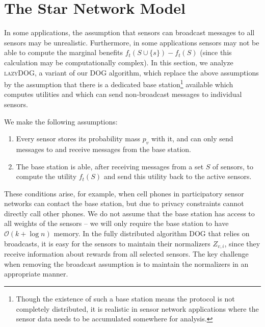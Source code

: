 \documentclass{sig-alternate-dan}
\numberwithin{equation}{section}
\newcommand{\algofont}[1]{\textsc{#1}}
\newcommand{\cO}{\mathcal{O}}
\newcommand{\dog}{\algofont{DOG}\xspace}
\newcommand{\lazydog}{\algofont{lazyDOG}\xspace}
\newcommand{\sensor}{\ensuremath{v}}
\newcommand{\obj}{\ensuremath{f}} %
\newcommand{\K}{\ensuremath{k}}
\newcommand{\denselist}{
    \itemsep -3pt\topsep-8pt\partopsep-8pt
}
\begin{document}
%
%
%
%
%
%


%
%



%
%
%
%
%
%


%

%
%
%
%

%
%
%


%
%
%
%
%
%


\section{The Star Network Model}
\label{sec:lazy-renorm}

In some applications, the assumption that sensors can broadcast messages to all sensors may be unrealistic.  Furthermore, in some applications sensors may not be able to compute the marginal benefits $\obj_{t}(S\cup\{s\})-\obj_{t}(S)$ (since this calculation may be computationally complex).  In this section, we analyze \lazydog, a variant of our \dog algorithm, which replace the above assumptions by the assumption that there is a dedicated base station\footnote{Though the existence of such a base station means the protocol is not
completely distributed, it is realistic in sensor network applications
where the sensor data needs to be accumulated somewhere for analysis.}
 available which  computes utilities and which can send non-broadcast messages to individual sensors.

We make the following assumptions:
\begin{enumerate}\denselist
\item Every sensor stores its probability mass $p_\sensor$ with
it, and can only send messages to and receive messages from the base station.  
\item The base station is able, after receiving messages from a set $S$ of sensors, to compute the utility $\obj_{t}(S)$ and send this utility back to the active sensors.  
%
%
\end{enumerate}

These conditions arise, for example, when cell phones in
participatory sensor networks can contact the base station, but due to
privacy constraints cannot directly call other phones.  We do not
assume that the base station has access to all weights of the sensors
-- we will only require the base station to have $\cO(\K + \log n)$
memory.  In the fully distributed algorithm \dog that relies on
broadcasts, it is easy for the sensors to maintain their normalizers
$Z_{\sensor,i}$, since they receive information about rewards from all
selected sensors. The key challenge when removing the broadcast
assumption is to maintain the normalizers in an appropriate manner.
\end{document}

